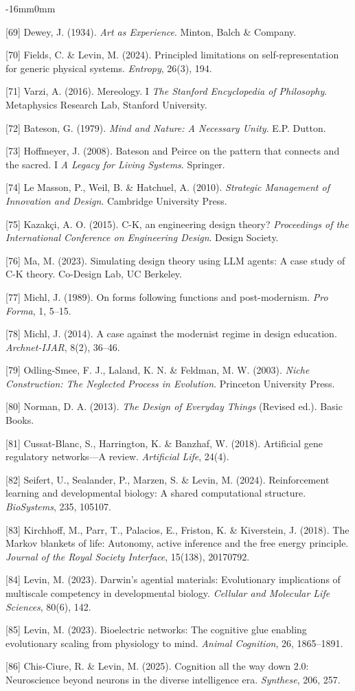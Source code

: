 \documentclass[10pt,oneside]{book}
\newcommand{\refentry}[1]{%
  \par\addvspace{0pt}%
  \begingroup\footnotesize\linespread{0.92}\selectfont
  \noindent\hangindent=4mm\hangafter=1 #1\par%
  \endgroup
}
\newenvironment{widebody}{%
  \begin{adjustwidth}{-16mm}{0mm}%
}{%
  \end{adjustwidth}%
}
\begin{document}
\begin{widebody}
\refentry{[69] Dewey, J. (1934). \textit{Art as Experience}. Minton, Balch \& Company.}
\refentry{[70] Fields, C. \& Levin, M. (2024). Principled limitations on self-representation for generic physical systems. \textit{Entropy}, 26(3), 194.}
\refentry{[71] Varzi, A. (2016). Mereology. I \textit{The Stanford Encyclopedia of Philosophy}. Metaphysics Research Lab, Stanford University.}
\refentry{[72] Bateson, G. (1979). \textit{Mind and Nature: A Necessary Unity}. E.P. Dutton.}
\refentry{[73] Hoffmeyer, J. (2008). Bateson and Peirce on the pattern that connects and the sacred. I \textit{A Legacy for Living Systems}. Springer.}
\refentry{[74] Le Masson, P., Weil, B. \& Hatchuel, A. (2010). \textit{Strategic Management of Innovation and Design}. Cambridge University Press.}
\refentry{[75] Kazakçi, A. O. (2015). C-K, an engineering design theory? \textit{Proceedings of the International Conference on Engineering Design}. Design Society.}
\refentry{[76] Ma, M. (2023). Simulating design theory using LLM agents: A case study of C-K theory. Co-Design Lab, UC Berkeley.}
\refentry{[77] Michl, J. (1989). On forms following functions and post-modernism. \textit{Pro Forma}, 1, 5--15.}
\refentry{[78] Michl, J. (2014). A case against the modernist regime in design education. \textit{Archnet-IJAR}, 8(2), 36--46.}
\refentry{[79] Odling-Smee, F. J., Laland, K. N. \& Feldman, M. W. (2003). \textit{Niche Construction: The Neglected Process in Evolution}. Princeton University Press.}
\refentry{[80] Norman, D. A. (2013). \textit{The Design of Everyday Things} (Revised ed.). Basic Books.}
\refentry{[81] Cussat-Blanc, S., Harrington, K. \& Banzhaf, W. (2018). Artificial gene regulatory networks---A review. \textit{Artificial Life}, 24(4).}
\refentry{[82] Seifert, U., Sealander, P., Marzen, S. \& Levin, M. (2024). Reinforcement learning and developmental biology: A shared computational structure. \textit{BioSystems}, 235, 105107.}
\refentry{[83] Kirchhoff, M., Parr, T., Palacios, E., Friston, K. \& Kiverstein, J. (2018). The Markov blankets of life: Autonomy, active inference and the free energy principle. \textit{Journal of the Royal Society Interface}, 15(138), 20170792.}
\refentry{[84] Levin, M. (2023). Darwin's agential materials: Evolutionary implications of multiscale competency in developmental biology. \textit{Cellular and Molecular Life Sciences}, 80(6), 142.}
\refentry{[85] Levin, M. (2023). Bioelectric networks: The cognitive glue enabling evolutionary scaling from physiology to mind. \textit{Animal Cognition}, 26, 1865--1891.}
\refentry{[86] Chis-Ciure, R. \& Levin, M. (2025). Cognition all the way down 2.0: Neuroscience beyond neurons in the diverse intelligence era. \textit{Synthese}, 206, 257.}

\end{widebody}
\end{document}
